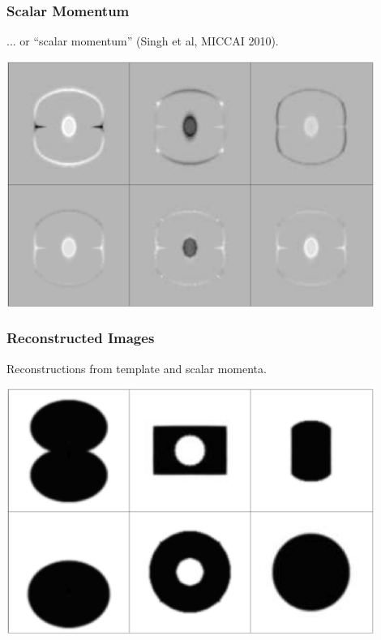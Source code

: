\begin{frame}
\frametitle{Scalar Momentum}
... or ``scalar momentum'' (Singh et al, MICCAI 2010).
\begin{center}
\includegraphics[width=0.9\textwidth]{alpha}
\end{center}
\end{frame}

\begin{frame}
\frametitle{Reconstructed Images}
Reconstructions from template and scalar momenta.
\begin{center}
\includegraphics[width=0.9\textwidth]{reconstructed}
\end{center}
\end{frame}


